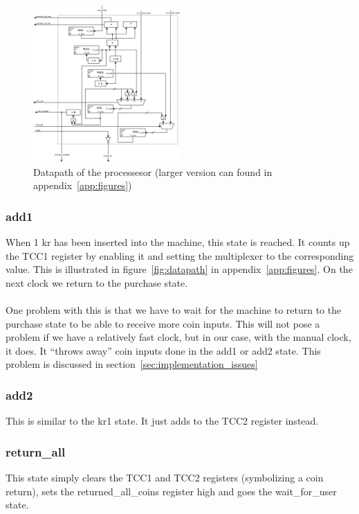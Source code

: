 \begin{figure}
\centering
\includegraphics[width=0.5\textwidth]{fig/datapath.pdf}
\caption{Datapath of the processesor (larger version can found in appendix~\ref{app:figures})}
\label{fig:datapath_small}
\end{figure}

\subsubsection{add1}
When 1 kr has been inserted into the machine, this state is reached. It counts up the TCC1 register by enabling it and setting the multiplexer to the corresponding value. This is illustrated in figure~\ref{fig:datapath} in appendix~\ref{app:figures}. On the next clock we return to the purchase state.\\
\\
One problem with this is that we have to wait for the machine to return to the purchase state to be able to receive more coin inputs. This will not pose a problem if we have a relatively fast clock, but in our case, with the manual clock, it does. It ``throws away'' coin inputs done in the add1 or add2 state. This problem is discussed in section~\ref{sec:implementation_issues}

\subsubsection{add2}
This is similar to the kr1 state. It just adds to the TCC2 register instead.

\subsubsection{return\_all}
This state simply clears the TCC1 and TCC2 registers (symbolizing a coin return), sets the returned\_all\_coins register high and goes the wait\_for\_user state.

